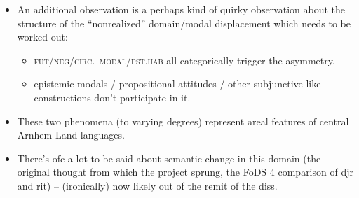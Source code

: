 \documentclass[11pt,dvipsnames]{article}
\begin{document}
\begin{description}
\begin{description}
\begin{itemize}
			\end{itemize}
		\end{description}
{\color {violet}\begin{itemize}
		\item An additional observation is a perhaps kind of quirky observation about the structure of the ``nonrealized'' domain/modal displacement which needs to be worked out:
		\begin{itemize}
		\item	\textsc{fut/neg/circ.~modal/pst.hab} all categorically trigger the asymmetry.
		\item epistemic modals / propositional attitudes / other subjunctive-like constructions don't participate in it.
		\end{itemize}
		\item  These two phenomena (to varying degrees) represent areal  features of central Arnhem Land languages.
		\item There's ofc a lot to be said about semantic change in this domain (the original thought from which the project sprung, the FoDS 4 comparison of djr and rit) -- (ironically) now likely out of the remit of the diss.
\end{itemize}	}


\end{description}

\vfill\small
\end{document}
